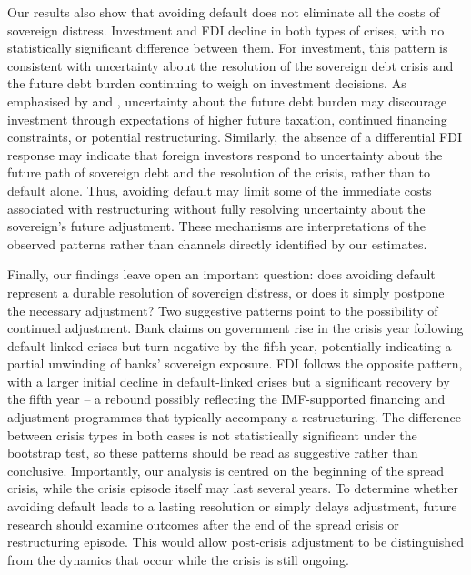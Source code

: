 \documentclass[12pt]{article}
\begin{document}
Our results also show that avoiding default does not eliminate all
the costs of sovereign distress. Investment and FDI decline in both
types of crises, with no statistically significant difference between
them. For investment, this pattern is consistent with uncertainty
about the resolution of the sovereign debt crisis and the future debt
burden continuing to weigh on investment decisions. As emphasised by
\citet{krugman1988financing} and \citet{sachs1989debt}, uncertainty
about the future debt burden may discourage investment through
expectations of higher future taxation, continued financing
constraints, or potential restructuring. Similarly, the absence of a
differential FDI response may indicate that foreign investors respond
to uncertainty about the future path of sovereign debt and the
resolution of the crisis, rather than to default alone. Thus, avoiding
default may limit some of the immediate costs associated with
restructuring without fully resolving uncertainty about the
sovereign's future adjustment. These mechanisms are interpretations of
the observed patterns rather than channels directly identified by our
estimates.

Finally, our findings leave open an important question: does avoiding
default represent a durable resolution of sovereign distress, or does
it simply postpone the necessary adjustment? Two suggestive patterns
point to the possibility of continued adjustment. Bank claims on
government rise in the crisis year following default-linked crises
but turn negative by the fifth year, potentially indicating a partial
unwinding of banks' sovereign exposure. FDI follows the opposite
pattern, with a larger initial decline in default-linked crises but a
significant recovery by the fifth year -- a rebound possibly
reflecting the IMF-supported financing and adjustment programmes that
typically accompany a restructuring. The difference between crisis
types in both cases is not statistically significant under the
bootstrap test, so these patterns should be read as suggestive rather
than conclusive. Importantly, our analysis is centred on the beginning
of the spread crisis, while the crisis episode itself may last several
years. To determine whether avoiding default leads to a lasting
resolution or simply delays adjustment, future research should examine
outcomes after the end of the spread crisis or restructuring episode.
This would allow post-crisis adjustment to be distinguished from the
dynamics that occur while the crisis is still ongoing.


\end{document}
